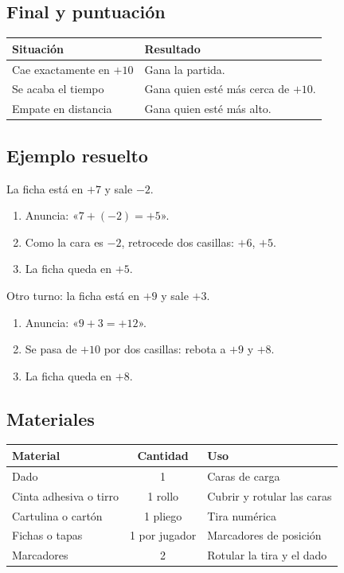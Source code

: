 \documentclass[12pt, letterpaper]{article}
\begin{document}
\subsection{Final y puntuación}

\begin{center}
\small
\begin{tabular}{@{}p{7.4cm} p{6.6cm}@{}}
\toprule
\textbf{Situación} & \textbf{Resultado}\\
\midrule
Cae exactamente en $+10$ & Gana la partida.\\
Se acaba el tiempo & Gana quien esté más cerca de $+10$.\\
Empate en distancia & Gana quien esté más alto.\\
\bottomrule
\end{tabular}
\end{center}

\subsection{Ejemplo resuelto}

La ficha está en $+7$ y sale $-2$.

\begin{cuadrosolucion}
\begin{enumerate}[leftmargin=*]
  \item Anuncia: «$7+(-2)=+5$».
  \item Como la cara es $-2$, retrocede dos casillas: $+6$, $+5$.
  \item La ficha queda en $+5$.
\end{enumerate}
Otro turno: la ficha está en $+9$ y sale $+3$.
\begin{enumerate}[leftmargin=*]
  \item Anuncia: «$9+3=+12$».
  \item Se pasa de $+10$ por dos casillas: rebota a $+9$ y $+8$.
  \item La ficha queda en $+8$.
\end{enumerate}
\end{cuadrosolucion}

\subsection{Materiales}

\begin{center}
\small
\begin{tabular}{@{}p{5.0cm} c p{7.4cm}@{}}
\toprule
\textbf{Material} & \textbf{Cantidad} & \textbf{Uso}\\
\midrule
Dado & 1 & Caras de carga\\
Cinta adhesiva o tirro & 1 rollo & Cubrir y rotular las caras\\
Cartulina o cartón & 1 pliego & Tira numérica\\
Fichas o tapas & 1 por jugador & Marcadores de posición\\
Marcadores & 2 & Rotular la tira y el dado\\
\bottomrule
\end{tabular}
\end{center}
\end{document}
